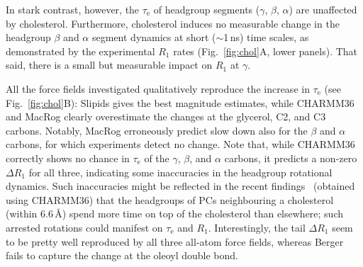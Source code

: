 \documentclass[journal=jpcbfk,manuscript=article,layout=twocolumn]{achemso}
\begin{document}
In stark contrast, however,
the $\tau_\mathrm e$ of headgroup segments ($\gamma$, $\beta$, $\alpha$)
are unaffected by cholesterol.
%
Furthermore, cholesterol induces no measurable change in the
headgroup $\beta$ and $\alpha$ segment
dynamics at short ($\sim$1\,ns) time scales, as
demonstrated by
the experimental $R_{1}$ rates (Fig.~\ref{fig:chol}A, lower panels).
That said,
there is a small but measurable impact on $R_1$ at $\gamma$.

All the force fields investigated qualitatively reproduce the increase in $\tau_\mathrm e$ (see Fig.~\ref{fig:chol}B):
Slipids gives the best magnitude estimates, while CHARMM36 and MacRog clearly overestimate the changes at the glycerol, C2, and C3 carbons. Notably, MacRog  erroneously predict slow down also for the $\beta$ and $\alpha$ carbons, for which experiments detect no change.
%
Note that,  while CHARMM36 correctly shows no chance in $\tau_\mathrm{e}$
of the $\gamma$, $\beta$, and $\alpha$ carbons,
it predicts a non-zero $\Delta R_{1}$ for all three, indicating some inaccuracies in the
headgroup rotational dynamics. %
Such inaccuracies might be reflected in the recent findings~\cite{leeb18}
(obtained using CHARMM36)
that 
the headgroups of PCs neighbouring a cholesterol (within 6.6\,\AA) spend more time on top of the cholesterol than elsewhere;
such arrested rotations could manifest on $\tau_\mathrm e$ and $R_1$.
%
Interestingly, 
the tail $\Delta R_{1}$ seem to be pretty well reproduced by
all three all-atom force fields, whereas Berger fails to capture the change at the oleoyl double bond.


\end{document}
